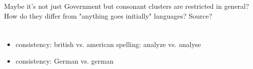 \documentclass[
]{scrartcl}
\begin{document}
Maybe it's not just Government but consonant clusters are restricted
in general? How do they differ from "anything goes initially" languages?
Source?

\section*{\TODO{}}
\begin{itemize}
\item consistency: british vs. american spelling: analyze vs. analyse
\item consistency: German vs. german
\end{itemize}

\printbibliography
\end{document}
